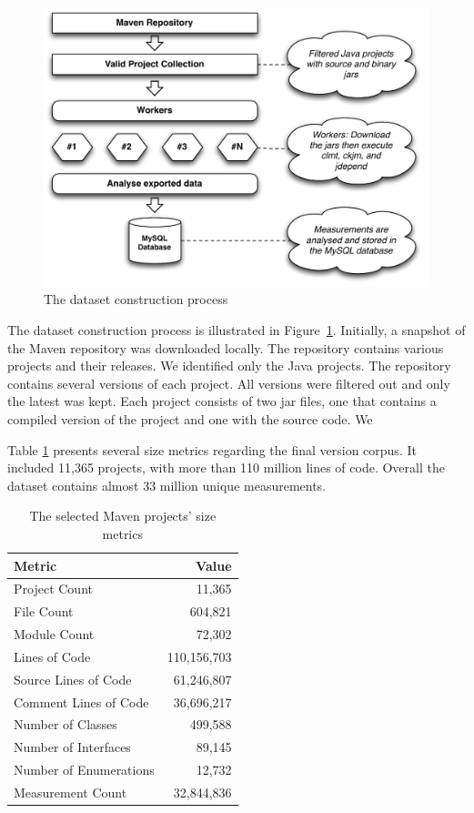 \documentclass{sig-alternate}
\begin{document}
\begin{figure}
\centering
\includegraphics[scale=0.5]{import-process}
\caption{The dataset construction process}
\label{fig:dataset-construction}
\end{figure}

The dataset construction process is illustrated in Figure~\ref{fig:dataset-construction}. Initially, a snapshot of the Maven repository was downloaded locally. The repository contains various projects and their releases. We identified only the Java projects. The repository contains several versions of each project. All versions were filtered out and only the latest was kept. Each project consists of two {\sc jar} files, one that contains a compiled version of the project and one with the source code. We

Table \ref{tbl:oss-size-metrics} presents several size metrics regarding the final version corpus. It included 11,365 projects, with more than 110 million lines of code. Overall the dataset contains almost 33 million unique measurements.

\begin{table}
\centering
\caption{The selected Maven projects' size metrics}
\label{tbl:oss-size-metrics}
\begin{tabular}{l r}
 \hline
\textbf{Metric} & \textbf{Value}\\
\hline
Project Count & 11,365\\
File Count & 604,821\\
Module Count & 72,302\\
Lines of Code & 110,156,703\\
Source Lines of Code & 61,246,807\\
Comment Lines of Code & 36,696,217\\
Number of Classes & 499,588\\
Number of Interfaces & 89,145\\
Number of Enumerations & 12,732\\
Measurement Count & 32,844,836\\
\hline
\end{tabular}
\end{table}
\end{document}

